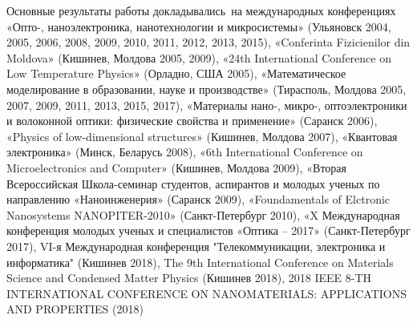 {\probation}
Основные результаты работы докладывались~на международных конференциях «Опто-, наноэлектроника, нанотехнологии и микросистемы» (Ульяновск 2004, 2005, 2006, 2008, 2009, 2010, 2011, 2012, 2013, 2015), «Conferinta Fizicienilor din Moldova» (Кишинев, Молдова 2005, 2009), «24th International Conference on Low Temperature Physics» (Орладно, США 2005), «Математическое моделирование в образовании, науке и производстве» (Тирасполь, Молдова 2005, 2007, 2009, 2011, 2013, 2015, 2017), «Материалы нано-, микро-, оптоэлектроники и волоконной оптики: физические свойства и применение» (Саранск 2006), «Physics of low-dimensional structures» (Кишинев, Молдова 2007), «Квантовая электроника» (Минск, Беларусь 2008), «6th International Conference on Microelectronics and Computer» (Кишинев, Молдова 2009), «Вторая Всероссийская Школа-семинар студентов, аспирантов и молодых ученых по направлению «Наноинженерия» (Саранск 2009), «Foundamentals of Elctronic Nanosystems NANOPITER-2010» (Санкт-Петербург 2010), «X Международная конференция молодых ученых и специалистов «Оптика – 2017» (Санкт-Петербург 2017), VI-я Международная конференция "Телекоммуникации, электроника и информатика" (Кишинев 2018), The 9th International Conference on Materials Science and Condensed Matter Physics (Кишинев 2018), 2018 IEEE 8-TH INTERNATIONAL CONFERENCE ON NANOMATERIALS: APPLICATIONS AND PROPERTIES (2018)



